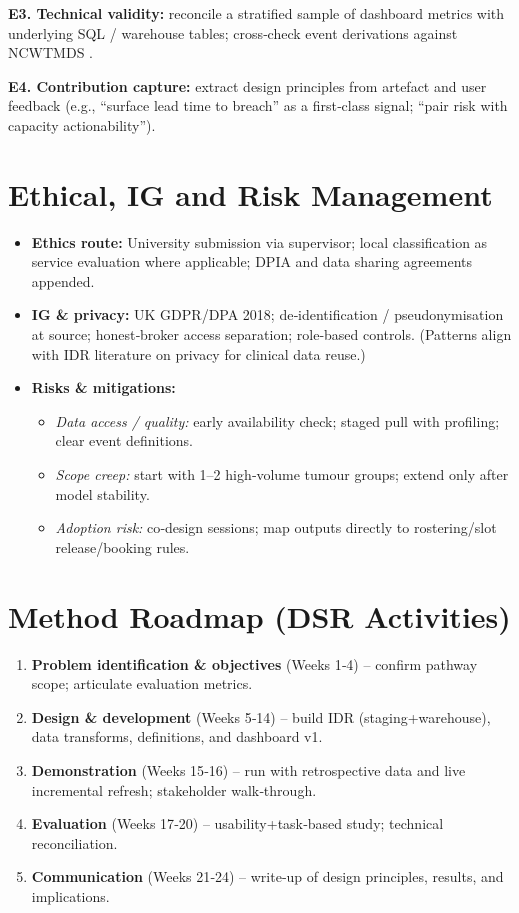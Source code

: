 \documentclass[12pt, a4paper, twoside]{article} %
\begin{document}
\textbf{E3. Technical validity:} reconcile a stratified sample of dashboard metrics with underlying SQL / warehouse tables; cross‑check event derivations against NCWTMDS \citep{NHSDigital2026}.

\textbf{E4. Contribution capture:} extract design principles from artefact and user feedback (e.g., “surface lead time to breach” as a first‑class signal; “pair risk with capacity actionability”).  

\section{Ethical, IG and Risk Management}

\begin{itemize}
  \item \textbf{Ethics route:} University submission via supervisor; local classification as service evaluation where applicable; DPIA and data sharing agreements appended.
  \item \textbf{IG \& privacy:} UK GDPR/DPA 2018; de‑identification / pseudonymisation at source; honest‑broker access separation; role‑based controls. (Patterns align with IDR literature on privacy for clinical data reuse.) \citep{gagalova2020}
  \item \textbf{Risks \& mitigations:}
  \begin{itemize}
    \item \emph{Data access / quality:} early availability check; staged pull with profiling; clear event definitions. \citep{NHSDigital2026}
    \item \emph{Scope creep:} start with 1–2 high‑volume tumour groups; extend only after model stability.
    \item \emph{Adoption risk:} co‑design sessions; map outputs directly to rostering/slot release/booking rules.
  \end{itemize}
\end{itemize}

\section{Method Roadmap (DSR Activities)}

\begin{enumerate}
  \item \textbf{Problem identification \& objectives} (Weeks 1‑4) – confirm pathway scope; articulate evaluation metrics. \citep{Peffers2007} 
  \item \textbf{Design \& development} (Weeks 5‑14) – build IDR (staging+warehouse), data transforms, definitions, and dashboard v1. \citep{gagalova2020}
  \item \textbf{Demonstration} (Weeks 15‑16) – run with retrospective data and live incremental refresh; stakeholder walk‑through.\citep{Peffers2007}
  \item \textbf{Evaluation} (Weeks 17‑20) – usability+task‑based study; technical reconciliation.
  \item \textbf{Communication} (Weeks 21‑24) – write‑up of design principles, results, and implications.
\end{enumerate}
\end{document}
